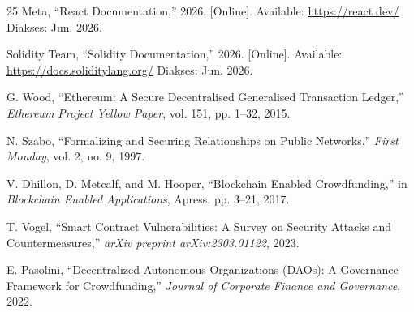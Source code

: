 \documentclass[conference]{IEEEtran}
\begin{document}
\begin{thebibliography}{25}
Meta, ``React Documentation,'' 2026. [Online]. Available: \url{https://react.dev/} Diakses: Jun. 2026.

Solidity Team, ``Solidity Documentation,'' 2026. [Online]. Available: \url{https://docs.soliditylang.org/} Diakses: Jun. 2026.

G. Wood, ``Ethereum: A Secure Decentralised Generalised Transaction Ledger,'' \textit{Ethereum Project Yellow Paper}, vol. 151, pp. 1--32, 2015.

N. Szabo, ``Formalizing and Securing Relationships on Public Networks,'' \textit{First Monday}, vol. 2, no. 9, 1997.

V. Dhillon, D. Metcalf, and M. Hooper, ``Blockchain Enabled Crowdfunding,'' in \textit{Blockchain Enabled Applications}, Apress, pp. 3--21, 2017.

T. Vogel, ``Smart Contract Vulnerabilities: A Survey on Security Attacks and Countermeasures,'' \textit{arXiv preprint arXiv:2303.01122}, 2023.

E. Pasolini, ``Decentralized Autonomous Organizations (DAOs): A Governance Framework for Crowdfunding,'' \textit{Journal of Corporate Finance and Governance}, 2022.

\end{thebibliography}
\end{document}
